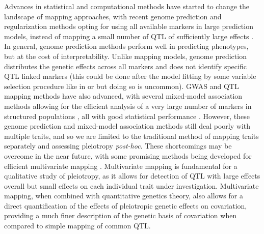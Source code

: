 \begin{refsection}
Advances in statistical and computational methods have started to change
the landscape of mapping approaches, with recent genome prediction and
regularization methods opting for using all
available markers in large prediction models, instead of mapping a small
number of QTL of sufficiently large effects \parencite{Meuwissen2001-cu,De_Los_Campos2013-gn}.
In general, genome prediction methods
perform well in predicting phenotypes, but at the cost of
interpretability. Unlike mapping models, genome prediction distributes
the genetic effects across all markers and does not identify specific
QTL linked markers (this could be done after the model fitting by some
variable selection procedure like in \textcite{Piironen2015-ai} or \textcite{Moser2015-sm}
 but doing so is uncommon). GWAS and QTL
mapping methods have also advanced, with several mixed-model association
methods allowing for the efficient analysis of a very large number of
markers in structured populations \parencite{Lipka2012-tf,Zhou2012-zl,Lippert2011-jn}
, all with good statistical performance \parencite{Eu-Ahsunthornwattana2014-fn}.
However, these genome prediction and mixed-model association
methods still deal poorly with multiple traits, and so we are limited to
the traditional method of mapping traits separately and assessing
pleiotropy \emph{post-hoc}. These shortcomings may be overcome in the
near future, with some promising methods being developed for efficient
multivariate mapping \parencite{Pitchers2017-ge,Hannah2018-zh,Kemper2018-gi}.
Multivariate mapping is
fundamental for a qualitative study of pleiotropy, as it allows for
detection of QTL with large effects overall but small effects on each
individual trait under investigation. Multivariate mapping, when
combined with quantitative genetics theory, also allows for a direct
quantification of the effects of pleiotropic genetic effects on
covariation, providing a much finer description of the genetic basis 
of covariation when compared to simple mapping of common QTL.


\end{refsection}
